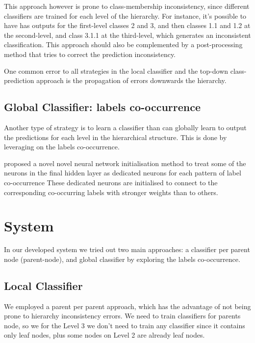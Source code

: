 \documentclass[11pt,a4paper]{article}
\begin{document}
This approach however is prone to class-membership inconsistency, since different classifiers are
trained for each level of the hierarchy. For instance, it's possible to have has outputs for the
first-level classes 2 and 3, and then classes 1.1 and 1.2 at the second-level, and class 3.1.1
at the third-level, which generates an inconsistent classification. This approach should also
be complemented by a post-processing method that tries to correct the prediction inconsistency.

One common error to all strategies in the local classifier and the top-down class-prediction
approach is the propagation of errors downwards the hierarchy.



\subsection{Global Classifier: labels co-occurrence}

Another type of strategy is to learn a classifier than can globally learn to output the predictions
for each level in the hierarchical structure. This is done by leveraging on the labels co-occurrence.

\citet{kurata-etal-2016-improved} proposed a novel novel neural network initialisation method to
treat some of the neurons in the final hidden layer as dedicated neurons for each pattern of label
co-occurrence These dedicated neurons are initialised to connect to the corresponding co-occurring
labels with stronger weights than to others.








\section{System}\label{system}

In our developed system we tried out two main approaches: a classifier per
parent node (parent-node), and global classifier by exploring the
labels co-occurrence.



\subsection{Local Classifier}

We employed a parent per parent approach, which has the advantage of not being
prone to hierarchy inconsistency errors. We need to train classifiers for
parents node, so we for the Level 3 we don't need to train any classifier
since it contains only leaf nodes, plus some nodes on Level 2 are already leaf
nodes.
\end{document}
